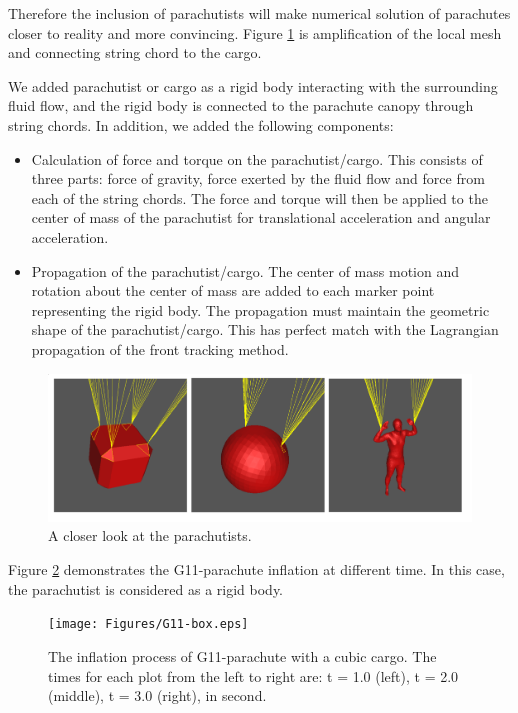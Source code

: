 Therefore the inclusion of parachutists will make numerical solution of
parachutes closer to reality and more convincing.  Figure \ref{fig:init_closer}
is amplification of the local mesh and connecting string chord to the cargo.

We added parachutist or cargo as a rigid body interacting with the surrounding
fluid flow, and the rigid body is connected to the parachute canopy through
string chords. In addition, we added the following components:

\begin{itemize}
\item Calculation of force and torque on the parachutist/cargo. This consists
of three parts: force of gravity, force exerted by the fluid flow and force
from each of the string chords. The force and torque will then be applied to
the center of mass of the parachutist for translational acceleration and
angular acceleration.

\item Propagation of the parachutist/cargo. The center
of mass motion and rotation about the center of mass are added to each marker
point representing the rigid body. The propagation must maintain the geometric
shape of the parachutist/cargo. This has perfect match with the Lagrangian
propagation of the front tracking method.
\end{itemize}

\begin{figure}[!ht] \centering
\includegraphics[width=6in]{Figures/parachutist-1.png} \caption{A closer look at
the parachutists.}\label{fig:init_closer} \end{figure}

Figure \ref{fig:G11-inflation} demonstrates the G11-parachute inflation at
different time. In this case, the parachutist is considered as a rigid body.

\begin{figure}[!ht] \centering \texttt{[image: Figures/G11-box.eps]}
\caption{The inflation process of G11-parachute with a cubic cargo.  The times
for each plot from the left to right are: t = 1.0 (left), t = 2.0 (middle), t =
3.0 (right), in second.} \label{fig:G11-inflation} \end{figure}

